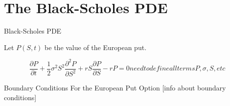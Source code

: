 \section{The Black-Scholes PDE}

\begin{frame}{Black-Scholes PDE}

Let \(P(S,t)\) be the value of the European put.

\[
\frac{\partial P}{\partial t}
+\frac{1}{2}\sigma^{2}S^{2}\frac{\partial^{2}P}{\partial S^{2}}
+rS\frac{\partial P}{\partial S}
-rP=0

need to define all terms P, \sigma, S, etc
\]

\end{frame}

\begin{frame}{Boundary Conditions For the European Put Option}
    [info about boundary conditions]
\end{frame}